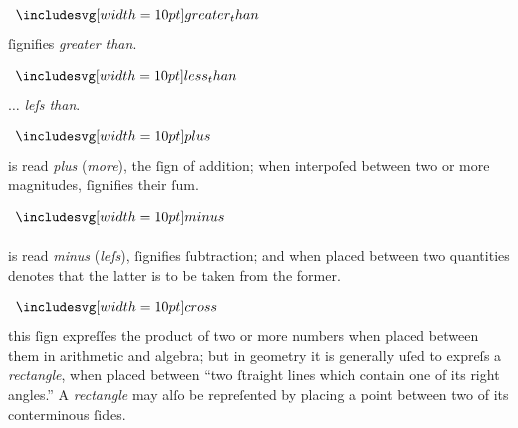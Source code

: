 \begin{minipage}[t]{0.20\textwidth}
  \begin{center}
    $\bgt$
  \end{center}
\end{minipage}%
\begin{minipage}[t]{0.80\textwidth}
  ſignifies \textit{greater than}.
\end{minipage}

\begin{minipage}[t]{0.20\textwidth}
  \begin{center}
    $\blt$
  \end{center}
\end{minipage}%
\begin{minipage}[t]{0.80\textwidth}
  $\ldots$ \textit{leſs than}.
\end{minipage}

\begin{minipage}[t]{0.20\textwidth}
  \begin{center}
    $\bplus$
  \end{center}
\end{minipage}%
\begin{minipage}[t]{0.80\textwidth}
  is read \textit{plus} (\textit{more}), the ſign of addition; when interpoſed between two or more magnitudes, ſignifies their ſum.
\end{minipage}

\begin{minipage}[t]{0.20\textwidth}
  \begin{center}
    $\bminus$
  \end{center}
\end{minipage}%
\begin{minipage}[t]{0.80\textwidth}
  is read \textit{minus} (\textit{leſs}), ſignifies ſubtraction; and when placed between two quantities denotes that the latter is to be taken from the former.
\end{minipage}

\begin{minipage}[t]{0.20\textwidth}
  \begin{center}
    $\bcross$
  \end{center}
\end{minipage}%
\begin{minipage}[t]{0.80\textwidth}
  this ſign expreſſes the product of two or more numbers when placed between them in arithmetic and algebra; but in geometry it is generally uſed to expreſs a \textit{rectangle}, when placed between “two ſtraight lines which contain one of its right angles.” A \textit{rectangle} may alſo be repreſented by placing a point between two of its conterminous ſides.
\end{minipage}


